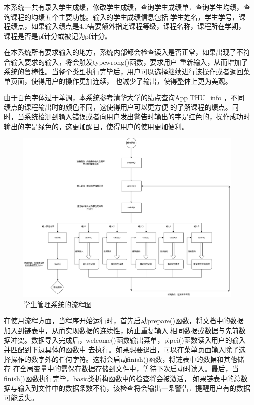 \documentclass[fontset=windows]{article}
\begin{document}
本系统一共有录入学生成绩，修改学生成绩，查询学生成绩单，查询学生均绩，查询课程的均绩五个主要功能。输入的学生成绩信息包括
学生姓名，学生学号，课程绩点，如果输入绩点是4.0需要额外指定课程等级，课程名称，课程所在学期，课程是否是pf计分或被记为pf计分。

在本系统所有要求输入的地方，系统内部都会检查读入是否正常，如果出现了不符合输入要求的输入，将会触发typewrong()函数，要求用户
重新输入，从而增加了系统的鲁棒性。当整个类型执行完毕后，用户可以选择继续进行该操作或者返回菜单页面，使得用户的操作更加连续，
也减少了输出，使得整体上更为美观。

由于白色字体过于单调，本系统参考清华大学的绩点查询App{ }THU\_info{ }，不同绩点的课程输出时的颜色不同，这使得用户可以更方便
的了解课程的绩点。同时，当系统检测到输入错误或者向用户发出警告时输出的字是红色的，操作成功时输出的字是绿色的，这更加醒目，使得用户的使用更加便利。

\begin{figure}[h]
	\hspace{0.1cm}
	\includegraphics[width = 16cm]{picture1.png}
	\vspace{1cm}
	\caption{学生管理系统的流程图}
\end{figure}

在使用流程方面，当程序开始运行时，首先启动prepare()函数，将文档中的数据加入到链表中，从而实现数据的连续性，防止重复输入
相同数据或数据与先前数据冲突。数据导入完成后，welcome()函数输出菜单，pipei()函数读入用户的输入并匹配到下边具体的函数中
去执行。如果想要退出，可以在菜单页面输入除了选择操作的数字外的任何字符。这将会启动finish()函数，将链表中的数据和其他储存
在全局变量中的需保存数据存储到文件中，等待下次启动时读入。最后，当finish()函数执行完毕，basic类析构函数中的检查将会被激活，
如果链表中的总数据与输入到文件中的数据条数不符，该检查将会输出一条警告，提醒用户有的数据可能丢失。
\end{document}
